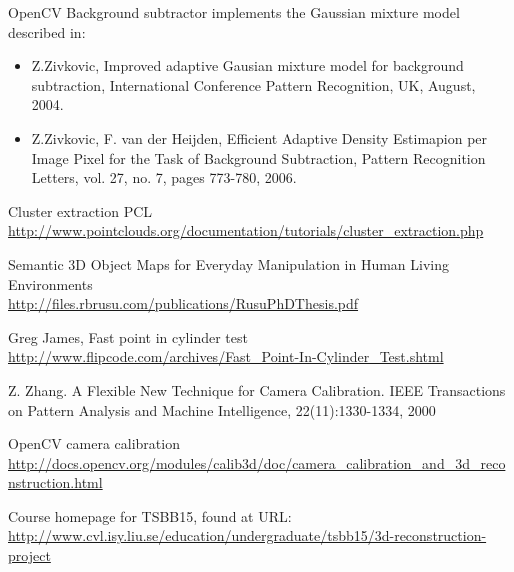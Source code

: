 \documentclass[10pt,a4paper]{article}
\begin{document}



\pagebreak
\tableofcontents
\newpage












	



\begin{thebibliography}{9}

OpenCV Background subtractor implements the Gaussian mixture model described in:
\begin{itemize}
\item Z.Zivkovic, Improved adaptive Gausian mixture model for background subtraction, International Conference Pattern Recognition, UK, August, 2004.
\item Z.Zivkovic, F. van der Heijden, Efficient Adaptive Density Estimapion per Image Pixel for the Task of Background Subtraction, Pattern Recognition Letters, vol. 27, no. 7, pages 773-780, 2006. 
\end{itemize}

Cluster extraction PCL\\
\url{http://www.pointclouds.org/documentation/tutorials/cluster_extraction.php}

Semantic 3D Object Maps for Everyday Manipulation in Human Living Environments\\
\url{http://files.rbrusu.com/publications/RusuPhDThesis.pdf}

Greg James, Fast point in cylinder test\\
\url{http://www.flipcode.com/archives/Fast_Point-In-Cylinder_Test.shtml}

Z. Zhang. A Flexible New Technique for Camera Calibration. IEEE Transactions on Pattern Analysis and Machine Intelligence, 22(11):1330-1334, 2000

OpenCV camera calibration\\
\url{http://docs.opencv.org/modules/calib3d/doc/camera_calibration_and_3d_reconstruction.html}

Course homepage for TSBB15, found at URL:
\url{http://www.cvl.isy.liu.se/education/undergraduate/tsbb15/3d-reconstruction-project}

\end{thebibliography}

\end{document}
